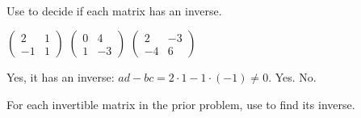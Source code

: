 \begin{exercises}
\begin{answer}
\begin{multline*}
\begin{aligned}
       \end{aligned}
    \end{multline*} 
   \end{answer}
 \recommended \item 
    Use  to decide if each matrix 
    has an inverse.
    \begin{exparts*}
      \partsitem
        $\begin{pmatrix}
           2  &1  \\
          -1  &1          
        \end{pmatrix}$
      \partsitem
        $\begin{pmatrix}
          0  &4  \\
          1  &-3
        \end{pmatrix}$
      \partsitem
        $\begin{pmatrix}
          2  &-3  \\
         -4  &6
        \end{pmatrix}$
    \end{exparts*}
    \begin{answer}
      \begin{exparts*}
        \partsitem Yes, it has an inverse: $ad-bc=2\cdot 1-1\cdot(-1)\neq 0$.
        \partsitem Yes.
        \partsitem No.
      \end{exparts*}
    \end{answer}
  \recommended \item  
     For each invertible matrix in the prior problem, use
      to find its inverse.
     \begin{answer}
\end{answer}
\end{exercises}
